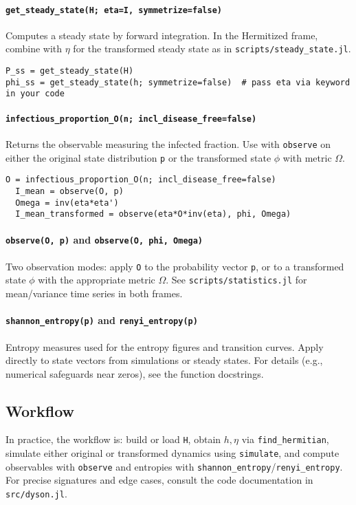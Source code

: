 \documentclass[11pt]{article}
\newcommand{\code}[1]{\texttt{#1}}
\begin{document}
\paragraph{\code{get\_steady\_state(H; eta=I, symmetrize=false)}} Computes a steady state by forward integration.
In the Hermitized frame, combine with \(\eta\) for the transformed steady state as in \code{scripts/steady\_state.jl}.

\begin{Verbatim}[fontsize=\small]
P_ss = get_steady_state(H)
phi_ss = get_steady_state(h; symmetrize=false)  # pass eta via keyword in your code
\end{Verbatim}

\paragraph{\code{infectious\_proportion\_O(n; incl\_disease\_free=false)}} Returns the observable measuring the infected fraction.
Use with \code{observe} on either the original state distribution \code{p} or the transformed state \(\phi\) with metric \(\Omega\).

\begin{Verbatim}[fontsize=\small]
  O = infectious_proportion_O(n; incl_disease_free=false)
  I_mean = observe(O, p)
  Omega = inv(eta*eta')
  I_mean_transformed = observe(eta*O*inv(eta), phi, Omega)
\end{Verbatim}

\paragraph{\code{observe(O, p)} and \code{observe(O, phi, Omega)}} Two observation modes: apply \code{O} to the probability vector \code{p}, or to a transformed state \(\phi\) with the appropriate metric \(\Omega\).
See \code{scripts/statistics.jl} for mean/variance time series in both frames.

\paragraph{\code{shannon\_entropy(p)} and \code{renyi\_entropy(p)}} Entropy measures used for the entropy figures and transition curves. Apply directly to state vectors from simulations or steady states.
For details (e.g., numerical safeguards near zeros), see the function docstrings.

\subsection{Workflow}
In practice, the workflow is: build or load \code{H}, obtain \(h,\eta\) via \code{find\_hermitian}, simulate either original or transformed dynamics using \code{simulate}, and compute observables with \code{observe} and entropies with \code{shannon\_entropy}/\code{renyi\_entropy}. For precise signatures and edge cases, consult the code documentation in \code{src/dyson.jl}.
\end{document}
